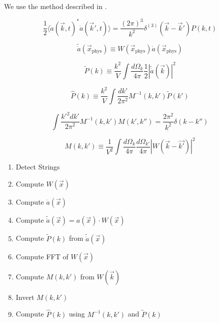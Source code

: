 \documentclass[a4paper]{article}
\begin{document}
We use the method described in \cite[sec. 3.2]{improved_estimation_hiramatsu}.

\begin{equation}
    \frac{1}{2} \langle \dot{a}(\vec{k}, t)^* \dot{a}(\vec{k}', t) \rangle = \frac{(2\pi)^3}{k^2} \delta^{(3)}(\vec{k} - \vec{k}') P(k, t)
\end{equation}

\begin{equation}
    \tilde{\dot{a}}(\vec{x}_\mathrm{phys}) \equiv W(\vec{x}_\mathrm{phys}) \dot{a}(\vec{x}_\mathrm{phys})
\end{equation}

\begin{equation}
    \tilde{P}(k) \equiv \frac{k^2}{V} \int \frac{d \Omega_k}{4\pi} \frac{1}{2} \left| \tilde{\dot{a}}( \vec{k} ) \right|^2
\end{equation}

\begin{equation}
    \hat{P}(k) \equiv \frac{k^2}{V} \int \frac{d k'}{2 \pi^2} M^{-1}(k, k') \tilde{P}(k')
\end{equation}

\begin{equation}
    \int \frac{k'^2 d k'}{2 \pi^2} M^{-1}(k, k') M(k', k'') = \frac{2\pi^2}{k^2} \delta(k - k'')
\end{equation}

\begin{equation}
    M(k, k') \equiv \frac{1}{V^2} \int \frac{d \Omega_k}{4 \pi} \frac{d \Omega_{k'}}{4 \pi} \left| W(\vec{k} - \vec{k'}) \right|^2
\end{equation}

\begin{enumerate}
    \item Detect Strings
    \item Compute $W(\vec{x})$
    \item Compute $\dot{a}(\vec{x})$
    \item Compute $\tilde{\dot{a}}(\vec{x}) = a(\vec{x}) \cdot W(\vec{x})$
    \item Compute $\tilde{P}(k)$ from $\tilde{\dot{a}}(\vec{x})$
    \item Compute FFT of $W(\vec{x})$
    \item Compute $M(k, k')$ from $W(\vec{k})$
    \item Invert $M(k, k')$
    \item Compute $\hat{P}(k)$ using $M^{-1}(k, k')$ and $\tilde{P}(k)$
\end{enumerate}
\end{document}
